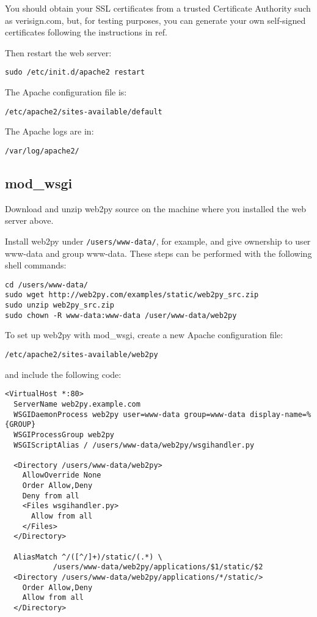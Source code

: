 \documentclass[justified,sixbynine,notoc]{tufte-book}
\def\ft{\small\tt}
\begin{document}
\begin{fullwidth}
You should obtain your SSL certificates from a trusted Certificate Authority such as verisign.com, but, for testing purposes, you can generate your own self-signed certificates following the instructions in ref.~\cite{openssl}

Then restart the web server:
\begin{lstlisting}
sudo /etc/init.d/apache2 restart
\end{lstlisting}

The Apache configuration file is:
\begin{lstlisting}
/etc/apache2/sites-available/default
\end{lstlisting}

The Apache logs are in:
\begin{lstlisting}
/var/log/apache2/
\end{lstlisting}

\goodbreak\subsection{mod\_wsgi}

Download and unzip web2py source on the machine where you installed the web server above.

Install web2py under {\ft /users/www-data/}, for example, and give ownership to user www-data and group www-data. These steps can be performed with the following shell commands:
\begin{lstlisting}
cd /users/www-data/
sudo wget http://web2py.com/examples/static/web2py_src.zip
sudo unzip web2py_src.zip
sudo chown -R www-data:www-data /user/www-data/web2py
\end{lstlisting}

To set up web2py with mod\_wsgi, create a new Apache configuration file:
\begin{lstlisting}
/etc/apache2/sites-available/web2py
\end{lstlisting}
\noindent and include the following code:
\begin{lstlisting}[keywords={}]
<VirtualHost *:80>
  ServerName web2py.example.com
  WSGIDaemonProcess web2py user=www-data group=www-data display-name=%{GROUP}
  WSGIProcessGroup web2py
  WSGIScriptAlias / /users/www-data/web2py/wsgihandler.py

  <Directory /users/www-data/web2py>
    AllowOverride None
    Order Allow,Deny
    Deny from all
    <Files wsgihandler.py>
      Allow from all
    </Files>
  </Directory>

  AliasMatch ^/([^/]+)/static/(.*) \
           /users/www-data/web2py/applications/$1/static/$2
  <Directory /users/www-data/web2py/applications/*/static/>
    Order Allow,Deny
    Allow from all
  </Directory>


\end{lstlisting}
\end{fullwidth}
\end{document}
